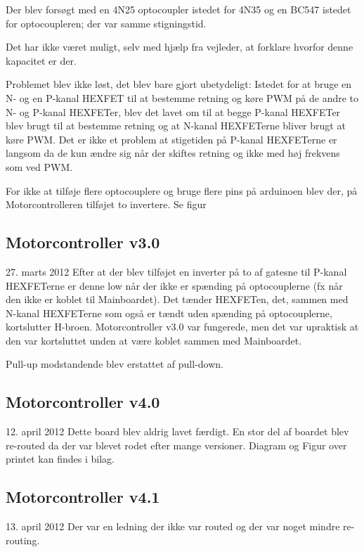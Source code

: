 \documentclass[a4paper,twoside,article,danish,table]{memoir}
\newcommand{\boarddate}[1]{\textcolor{blue!80!black}{#1}}
\begin{document}
Der blev forsøgt med en 4N25 optocoupler istedet for 4N35 og en BC547 istedet for optocoupleren; der var samme stigningstid.

Det har ikke været muligt, selv med hjælp fra vejleder, at forklare hvorfor denne kapacitet er der.

Problemet blev ikke løst, det blev bare gjort ubetydeligt: Istedet for at bruge en N- og en P-kanal HEXFET til at bestemme retning og køre PWM på de andre to N- og P-kanal HEXFETer, blev det lavet om til at begge P-kanal HEXFETer blev brugt til at bestemme retning og at N-kanal HEXFETerne bliver brugt at køre PWM. Det er ikke et problem at stigetiden på P-kanal HEXFETerne er langsom da de kun ændre sig når der skiftes retning og ikke med høj frekvens som ved PWM.

For ikke at tilføje flere optocouplere og bruge flere pins på arduinoen blev der, på Motorcontrolleren tilføjet to invertere. Se figur 
\subsection{Motorcontroller v3.0}
\boarddate{27. marts 2012}
Efter at der blev tilføjet en inverter på to af gatesne til P-kanal HEXFETerne er denne low når der ikke er spænding på optocouplerne (fx når den ikke er koblet til Mainboardet). Det tænder HEXFETen, det, sammen med N-kanal HEXFETerne som også er tændt uden spænding på optocouplerne, kortslutter H-broen. Motorcontroller v3.0 var fungerede, men det var upraktisk at den var kortsluttet unden at være koblet sammen med Mainboardet.

Pull-up modstandende blev erstattet af pull-down.
\subsection{Motorcontroller v4.0}
\boarddate{12. april 2012} Dette board blev aldrig lavet færdigt. En stor del af boardet blev re-routed da der var blevet rodet efter mange versioner. Diagram og Figur over printet kan findes i bilag. 

\subsection{Motorcontroller v4.1}
\boarddate{13. april 2012}
Der var en ledning der ikke var routed og der var noget mindre re-routing.
\end{document}

